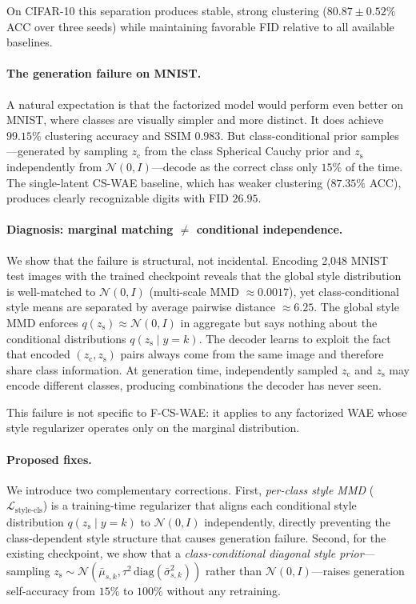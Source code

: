 \documentclass[10pt]{article}
\newcommand{\ours}{F-CS-WAE}
\newcommand{\simple}{CS-WAE}
\newcommand{\zc}{z_{\mathrm{c}}}
\newcommand{\zs}{z_{\mathrm{s}}}
\newcommand{\diag}{\mathrm{diag}}
\begin{document}
On CIFAR-10 this separation produces stable, strong clustering ($80.87\pm0.52\%$
ACC over three seeds) while maintaining favorable FID relative to all available
baselines.

\paragraph{The generation failure on MNIST.}
A natural expectation is that the factorized model would perform even better on
MNIST, where classes are visually simpler and more distinct.
It does achieve $99.15\%$ clustering accuracy and SSIM $0.983$.
But class-conditional prior samples---generated by sampling $\zc$ from the class
Spherical Cauchy prior and $\zs$ independently from $\mathcal{N}(0,I)$---decode
as the correct class only $15\%$ of the time.
The single-latent \simple{} baseline, which has weaker clustering ($87.35\%$ ACC),
produces clearly recognizable digits with FID $26.95$.

\paragraph{Diagnosis: marginal matching $\neq$ conditional independence.}
We show that the failure is structural, not incidental.
Encoding 2{,}048 MNIST test images with the trained checkpoint reveals that the
global style distribution is well-matched to $\mathcal{N}(0,I)$
(multi-scale MMD $\approx 0.0017$), yet class-conditional style means are separated
by average pairwise distance $\approx 6.25$.
The global style MMD enforces $q(\zs)\approx\mathcal{N}(0,I)$ in aggregate but
says nothing about the conditional distributions $q(\zs\mid y{=}k)$.
The decoder learns to exploit the fact that encoded $(\zc,\zs)$ pairs always come
from the same image and therefore share class information.
At generation time, independently sampled $\zc$ and $\zs$ may encode different classes,
producing combinations the decoder has never seen.

This failure is not specific to \ours: it applies to any factorized WAE whose style
regularizer operates only on the marginal distribution.

\paragraph{Proposed fixes.}
We introduce two complementary corrections.
First, \emph{per-class style MMD} ($\mathcal{L}_{\mathrm{style\text{-}cls}}$) is a
training-time regularizer that aligns each conditional style distribution
$q(\zs\mid y{=}k)$ to $\mathcal{N}(0,I)$ independently, directly preventing the
class-dependent style structure that causes generation failure.
Second, for the existing checkpoint, we show that a
\emph{class-conditional diagonal style prior}---sampling
$\zs\sim\mathcal{N}(\bar\mu_{s,k},\tau^2\,\diag(\bar\sigma_{s,k}^2))$ rather than
$\mathcal{N}(0,I)$---raises generation self-accuracy from $15\%$ to $100\%$
without any retraining.
\end{document}
